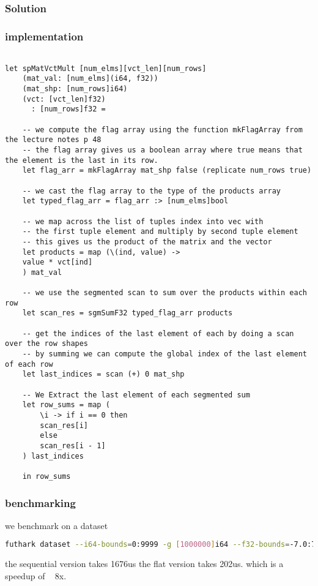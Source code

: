 \documentclass{article}
\begin{document}
\subsubsection*{Solution}

\subsubsection*{implementation}

\begin{lstlisting}[language=futhark]

let spMatVctMult [num_elms][vct_len][num_rows]
    (mat_val: [num_elms](i64, f32))
    (mat_shp: [num_rows]i64)
    (vct: [vct_len]f32)
      : [num_rows]f32 =

    -- we compute the flag array using the function mkFlagArray from the lecture notes p 48
    -- the flag array gives us a boolean array where true means that the element is the last in its row.
    let flag_arr = mkFlagArray mat_shp false (replicate num_rows true) 

    -- we cast the flag array to the type of the products array
    let typed_flag_arr = flag_arr :> [num_elms]bool

    -- we map across the list of tuples index into vec with 
    -- the first tuple element and multiply by second tuple element
    -- this gives us the product of the matrix and the vector
    let products = map (\(ind, value) -> 
    value * vct[ind]
    ) mat_val

    -- we use the segmented scan to sum over the products within each row
    let scan_res = sgmSumF32 typed_flag_arr products

    -- get the indices of the last element of each by doing a scan over the row shapes
    -- by summing we can compute the global index of the last element of each row
    let last_indices = scan (+) 0 mat_shp

    -- We Extract the last element of each segmented sum
    let row_sums = map (
        \i -> if i == 0 then 
        scan_res[i]
        else 
        scan_res[i - 1]
    ) last_indices

    in row_sums
\end{lstlisting}

\subsubsection*{benchmarking}

we benchmark on a dataset
\begin{lstlisting}[language=bash]
futhark dataset --i64-bounds=0:9999 -g [1000000]i64 --f32-bounds=-7.0:7.0 -g [1000000]f32 --i64-bounds=100:100 -g [10000]i64 --f32-bounds=-10.0:10.0 -g [10000]f32 > data.in
\end{lstlisting}

the sequential version takes 1676us the flat version takes 202us. which is a speedup of ~ 8x.
\end{document}
